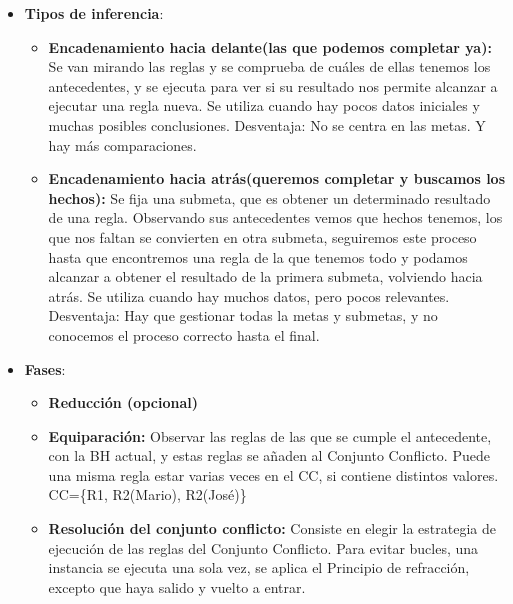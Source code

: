 \documentclass[12pt, twoside, openright]{report} %
\begin{document}
\begin{itemize}
    \begin{itemize}
    \item \textbf{Tipos de inferencia}:
      

      \begin{itemize}
      \item \textbf{Encadenamiento hacia delante(las que podemos completar
        ya):} Se van mirando las reglas y se comprueba de cuáles de
        ellas tenemos los antecedentes, y se ejecuta para ver si su
        resultado nos permite alcanzar a ejecutar una regla nueva. Se
        utiliza cuando hay pocos datos iniciales y muchas posibles
        conclusiones. Desventaja: No se centra en las metas. Y hay más
        comparaciones.
        \pagebreak
      \item \textbf{Encadenamiento hacia atrás(queremos completar y buscamos
        los hechos):} Se fija una submeta, que es obtener un determinado
        resultado de una regla. Observando sus antecedentes vemos que
        hechos tenemos, los que nos faltan se convierten en otra
        submeta, seguiremos este proceso hasta que encontremos una regla
        de la que tenemos todo y podamos alcanzar a obtener el resultado
        de la primera submeta, volviendo hacia atrás. Se utiliza cuando
        hay muchos datos, pero pocos relevantes. Desventaja: Hay que
        gestionar todas la metas y submetas, y no conocemos el proceso
        correcto hasta el final.
        
      \end{itemize}
    \item \textbf{Fases}:
      

      \begin{itemize}
      \item \textbf{Reducción (opcional)}
        
      \item \textbf{Equiparación:} Observar las reglas de las que se cumple
        el antecedente, con la BH actual, y estas reglas se añaden al
        Conjunto Conflicto. Puede una misma regla estar varias veces en
        el CC, si contiene distintos valores. CC=\{R1, R2(Mario),
        R2(José)\}
        
      \item \textbf{Resolución del conjunto conflicto:} Consiste en elegir
        la estrategia de ejecución de las reglas del Conjunto Conflicto.
        Para evitar bucles, una instancia se ejecuta una sola vez, se
        aplica el Principio de refracción, excepto que haya salido y
        vuelto a entrar.
        


\end{itemize}
\end{itemize}
\end{itemize}
\end{document}
